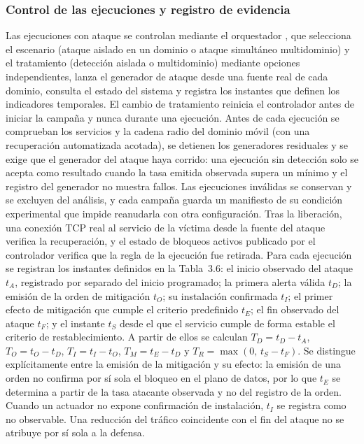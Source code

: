 \subsubsection{Control de las ejecuciones y registro de evidencia}

Las ejecuciones con ataque se controlan mediante el orquestador , que selecciona el escenario (ataque aislado en un dominio o ataque simultáneo multidominio) y el tratamiento (detección aislada o multidominio) mediante opciones independientes, lanza el generador de ataque desde una fuente real de cada dominio, consulta el estado del sistema y registra los instantes que definen los indicadores temporales. El cambio de tratamiento reinicia el controlador antes de iniciar la campaña y nunca durante una ejecución. Antes de cada ejecución se comprueban los servicios y la cadena radio del dominio móvil (con una recuperación automatizada acotada), se detienen los generadores residuales y se exige que el generador del ataque haya corrido: una ejecución sin detección solo se acepta como resultado cuando la tasa emitida observada supera un mínimo y el registro del generador no muestra fallos. Las ejecuciones inválidas se conservan y se excluyen del análisis, y cada campaña guarda un manifiesto de su condición experimental que impide reanudarla con otra configuración. Tras la liberación, una conexión TCP real al servicio de la víctima desde la fuente del ataque verifica la recuperación, y el estado de bloqueos activos publicado por el controlador verifica que la regla de la ejecución fue retirada. Para cada ejecución se registran los instantes definidos en la Tabla~3.6: el inicio observado del ataque $t_A$, registrado por separado del inicio programado; la primera alerta válida $t_D$; la emisión de la orden de mitigación $t_O$; su instalación confirmada $t_I$; el primer efecto de mitigación que cumple el criterio predefinido $t_E$; el fin observado del ataque $t_F$; y el instante $t_S$ desde el que el servicio cumple de forma estable el criterio de restablecimiento. A partir de ellos se calculan $T_D = t_D - t_A$, $T_O = t_O - t_D$, $T_I = t_I - t_O$, $T_M = t_E - t_D$ y $T_R = \max(0,\, t_S - t_F)$. Se distingue explícitamente entre la emisión de la mitigación y su efecto: la emisión de una orden no confirma por sí sola el bloqueo en el plano de datos, por lo que $t_E$ se determina a partir de la tasa atacante observada y no del registro de la orden. Cuando un actuador no expone confirmación de instalación, $t_I$ se registra como no observable. Una reducción del tráfico coincidente con el fin del ataque no se atribuye por sí sola a la defensa.

